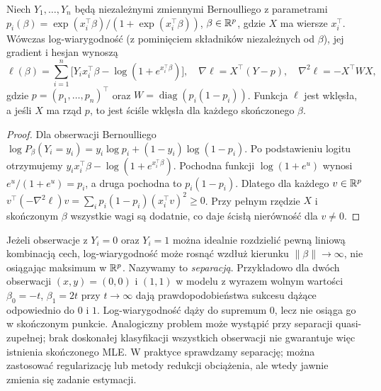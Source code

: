\begin{twierdzenie}
\label{thm:logit-score}
Niech $Y_1,\ldots,Y_n$ będą niezależnymi zmiennymi
Bernoulliego z parametrami
$p_i(\beta)=\exp(x_i^\top\beta)/
(1+\exp(x_i^\top\beta))$, $\beta\in\mathbb R^p$, gdzie
$X$ ma wiersze $x_i^\top$. Wówczas log-wiarygodność
(z pominięciem składników niezależnych od $\beta$),
jej gradient i hesjan wynoszą
\[
 \ell(\beta)=\sum_{i=1}^n\bigl[Y_i x_i^\top\beta
        -\log(1+e^{x_i^\top\beta})\bigr],\quad
 \nabla\ell=X^\top(Y-p),\quad
 \nabla^2\ell=-X^\top W X,
\]
gdzie $p=(p_1,\ldots,p_n)^\top$ oraz
$W=\operatorname{diag}(p_i(1-p_i))$.
Funkcja $\ell$ jest wklęsła, a jeśli $X$ ma rząd $p$,
to jest ściśle wklęsła dla każdego skończonego $\beta$.
\end{twierdzenie}
\begin{proof}
Dla obserwacji Bernoulliego
$\log P_\beta(Y_i=y_i)=y_i\log p_i+(1-y_i)\log(1-p_i)$.
Po podstawieniu logitu otrzymujemy
$y_ix_i^\top\beta-\log(1+e^{x_i^\top\beta})$.
Pochodna funkcji $\log(1+e^u)$ wynosi
$e^u/(1+e^u)=p_i$, a druga pochodna to $p_i(1-p_i)$.
Dlatego dla każdego $v\in\mathbb R^p$
$v^\top(-\nabla^2\ell)v=
\sum_i p_i(1-p_i)(x_i^\top v)^2\ge0$.
Przy pełnym rzędzie $X$ i skończonym $\beta$ wszystkie
wagi są dodatnie, co daje ścisłą nierówność dla $v\ne0$.
\end{proof}

\begin{uwaga}
\label{rem:glm-separation}
Jeżeli obserwacje z $Y_i=0$ oraz $Y_i=1$ można
idealnie rozdzielić pewną liniową kombinacją cech,
log-wiarygodność może rosnąć wzdłuż kierunku
$\|\beta\|\to\infty$, nie osiągając maksimum
w $\mathbb R^p$. Nazywamy to \emph{separacją}.
Przykładowo dla dwóch obserwacji $(x,y)=(0,0)$
i $(1,1)$ w modelu z wyrazem wolnym wartości
$\beta_0=-t$, $\beta_1=2t$ przy $t\to\infty$
dają prawdopodobieństwa sukcesu dążące odpowiednio
do $0$ i $1$. Log-wiarygodność dąży do supremum
$0$, lecz nie osiąga go w skończonym punkcie.
Analogiczny problem może wystąpić przy separacji
quasi-zupełnej; brak doskonałej klasyfikacji wszystkich
obserwacji nie gwarantuje więc istnienia skończonego MLE.
W praktyce sprawdzamy separację; można zastosować
regularizację lub metody redukcji obciążenia, ale
wtedy jawnie zmienia się zadanie estymacji.
\end{uwaga}

